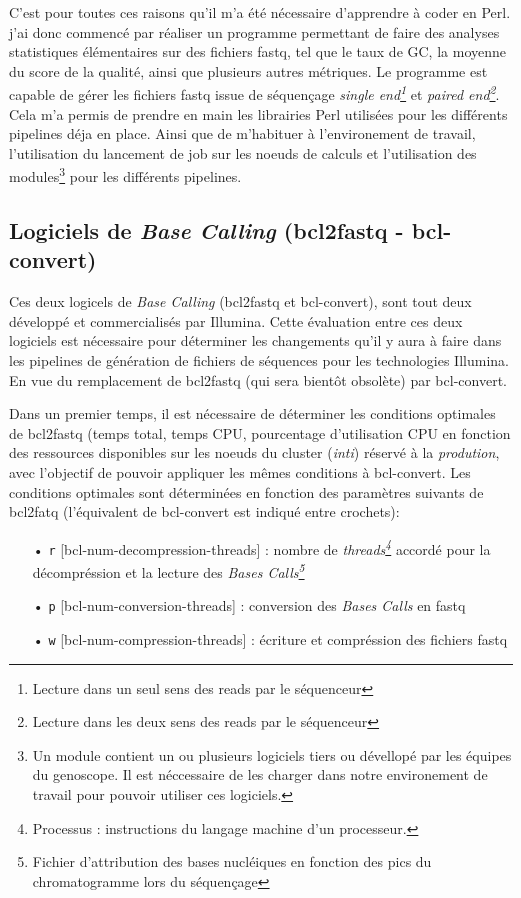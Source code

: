 C'est pour toutes ces raisons qu'il m'a été nécessaire d'apprendre à coder en Perl. j'ai donc commencé par réaliser un programme permettant de faire des analyses statistiques élémentaires sur des fichiers fastq, tel que le taux de GC, la moyenne du score de la qualité, ainsi que plusieurs autres métriques. Le programme est capable de gérer les fichiers fastq issue de séquençage \emph{single end\footnote{Lecture dans un seul sens des reads par le séquenceur}} et \emph{paired end\footnote{Lecture dans les deux sens des reads par le séquenceur}}. Cela m'a permis de prendre en main les librairies Perl utilisées pour les différents pipelines déja en place. Ainsi que de m'habituer à l'environement de travail, l'utilisation du lancement de job sur les noeuds de calculs et l'utilisation des modules\footnote{Un module contient un ou plusieurs logiciels tiers ou dévellopé par les équipes du genoscope. Il est néccessaire de les charger dans notre environement de travail pour pouvoir utiliser ces logiciels.} pour les différents pipelines.

\subsection{Logiciels de \emph{Base Calling} (bcl2fastq - bcl-convert)}
Ces deux logicels de \emph{Base Calling} (bcl2fastq et bcl-convert), sont tout deux développé et commercialisés par Illumina. Cette évaluation entre ces deux logiciels est nécessaire pour déterminer les changements qu'il y aura à faire dans les pipelines de génération de fichiers de séquences pour les technologies Illumina. En vue du remplacement de bcl2fastq (qui sera bientôt obsolète) par bcl-convert.

Dans un premier temps, il est nécessaire de déterminer les conditions optimales de bcl2fastq (temps total, temps CPU, pourcentage d'utilisation CPU en fonction des ressources disponibles sur les noeuds du cluster (\emph{inti}) réservé à la \emph{prodution}, avec l'objectif de pouvoir appliquer les mêmes conditions à bcl-convert. Les conditions optimales sont déterminées en fonction des paramètres suivants de bcl2fatq (l'équivalent de bcl-convert est indiqué entre crochets): \\
\begin{itemize}
    \item[•] \texttt{r} [bcl-num-decompression-threads] : nombre de \emph{threads\footnote{Processus : instructions du langage machine d'un processeur.}} accordé pour la décompréssion et la lecture des \emph{Bases Calls\footnote{Fichier d'attribution des bases nucléiques en fonction des pics du chromatogramme lors du séquençage}}
    \item[•] \texttt{p} [bcl-num-conversion-threads] : conversion des \emph{Bases Calls} en fastq
    \item[•] \texttt{w} [bcl-num-compression-threads] : écriture et compréssion des fichiers fastq\\
\end{itemize}


